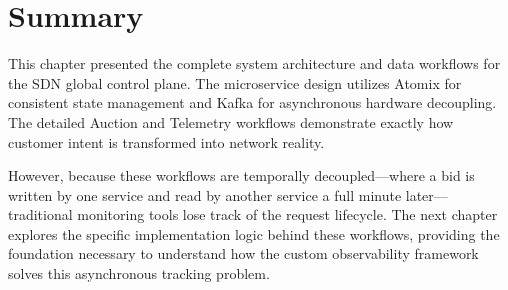 \section{Summary}

This chapter presented the complete system architecture and data workflows for the SDN global control plane. The microservice design utilizes Atomix for consistent state management and Kafka for asynchronous hardware decoupling. The detailed Auction and Telemetry workflows demonstrate exactly how customer intent is transformed into network reality. 

However, because these workflows are temporally decoupled—where a bid is written by one service and read by another service a full minute later—traditional monitoring tools lose track of the request lifecycle. The next chapter explores the specific implementation logic behind these workflows, providing the foundation necessary to understand how the custom observability framework solves this asynchronous tracking problem.